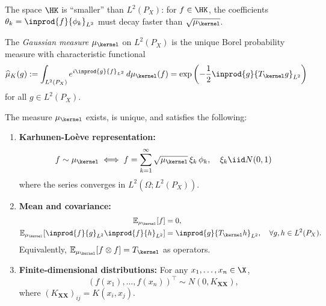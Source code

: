 \documentclass{article}
\begin{document}
\begin{remark}
	The space $\HK$ is ``smaller'' than $L^2(P_X)$: for $f \in \HK$, the coefficients $\theta_k = \inprod{f}{\phi_k}_{L^2}$ must decay faster than $\sqrt{\mu_\kernel}$.
\end{remark}


\begin{definition}
	\label{def:gaussian-measure}
	The \emph{Gaussian measure} $\mu_\kernel$ on $L^2(P_X)$ is the unique Borel probability measure with characteristic functional
	\begin{equation}
		\hat{\mu}_K(g) := \int_{L^2(P_X)} e^{i\inprod{g}{f}_{L^2}} \, d\mu_\kernel(f) = \exp\left( -\frac{1}{2} \inprod{g}{T_\kernel g}_{L^2} \right)
	\end{equation}
	for all $g \in L^2(P_X)$.
\end{definition}

\begin{theorem}
	\label{thm:gaussian-existence}
	The measure $\mu_\kernel$ exists, is unique, and satisfies the following:

	\begin{enumerate}[label=(\roman*)]
		\item \textbf{Karhunen-Lo\`eve representation:}
		      \begin{equation}
			      f \sim \mu_\kernel \iff f = \sum_{k=1}^\infty \sqrt{\mu_\kernel} \, \xi_k \, \phi_k, \quad \xi_k \iid N(0,1)
		      \end{equation}
		      where the series converges in $L^2(\Omega; L^2(P_X))$.

		\item \textbf{Mean and covariance:}
		      \begin{align}
			      \E_{\mu_\kernel}[f]                                       & = 0,                                                              \\
			      \E_{\mu_\kernel}[\inprod{f}{g}_{L^2} \inprod{f}{h}_{L^2}] & = \inprod{g}{T_\kernel h}_{L^2}, \quad \forall g, h \in L^2(P_X).
		      \end{align}
		      Equivalently, $\E_{\mu_\kernel}[f \otimes f] = T_\kernel$ as operators.

		\item \textbf{Finite-dimensional distributions:} For any $x_1, \ldots, x_n \in \X$,
		      \begin{equation}
			      (f(x_1), \ldots, f(x_n))^\top \sim N(0, K_{\mathbf{X}\mathbf{X}}),
		      \end{equation}
		      where $(K_{\mathbf{X}\mathbf{X}})_{ij} = K(x_i, x_j)$.
	\end{enumerate}
\end{theorem}
\end{document}
